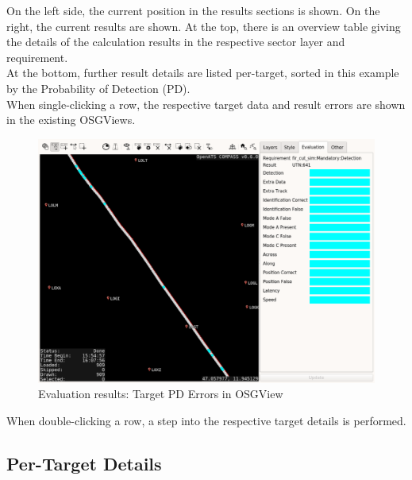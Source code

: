 On the left side, the current position in the results sections is shown. On the right, the current results are shown. At the top, there is an overview table giving the details of the calculation results in the respective sector layer and requirement. \\

At the bottom, further result details are listed per-target, sorted in this example by the Probability of Detection (PD). \\

When single-clicking a row, the respective target data and result errors are shown in the existing OSGViews.

\begin{figure}[H]
  \hspace*{-2.5cm}
    \includegraphics[width=18cm,frame]{figures/eval_results_pd_single_osgview.png}
  \caption{Evaluation results: Target PD Errors in OSGView}
\end{figure}

When double-clicking a row, a step into the respective target details is performed.

\subsection{Per-Target Details}

